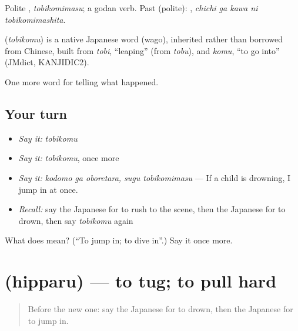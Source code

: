 Polite \textbf{}, \emph{tobikomimasu}; a godan verb. Past (polite): \textbf{  }, \emph{chichi ga kawa ni tobikomimashita}.

\begin{cousinweb}
\textbf{} (\emph{tobikomu}) is a native Japanese word (wago), inherited rather than borrowed from Chinese, built from \emph{tobi}, \textquotedblleft{}leaping\textquotedblright{} (from \emph{tobu}), and \emph{komu}, \textquotedblleft{}to go into\textquotedblright{} (JMdict, KANJIDIC2).
\end{cousinweb}

\begin{grammarlens}[title={What you've built}]
One more word for telling what happened.
\end{grammarlens}

\subsection*{Your turn}
\begin{itemize}
\raggedright
  \item \emph{Say it:} \emph{tobikomu}
  \item \emph{Say it:} \emph{tobikomu}, once more
  \item \emph{Say it:} \emph{kodomo ga oboretara, sugu tobikomimasu} — If a child is drowning, I jump in at once.
  \item \emph{Recall:} say the Japanese for to rush to the scene, then the Japanese for to drown, then say \emph{tobikomu} again
\end{itemize}

\begin{tcolorbox}[breakable,colback=teal!4,colframe=teal!35!black,title={Before you move on}]
What does  mean? (\textquotedblleft{}To jump in; to dive in\textquotedblright{}.) Say it once more.
\end{tcolorbox}
\section[\texorpdfstring{\ja{ひっぱる} (hipparu)}{ひっぱる (hipparu)}]{ (hipparu) — to tug; to pull hard}

\label{lesson:JA-C266-hipparu}



\begin{quote}
Before the new one: say the Japanese for to drown, then the Japanese for to jump in.
\end{quote}

